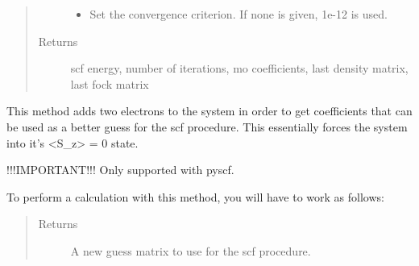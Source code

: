 \documentclass[letterpaper,10pt,english]{sphinxmanual}
\begin{document}
\begin{fulllineitems}
\begin{fulllineitems}
\begin{quote}
\begin{description}
\begin{itemize}
\item {} 
 \textendash{} Set the convergence criterion. If none is given, 1e-12 is used.

\end{itemize}

\item[{Returns}] \leavevmode
scf energy, number of iterations, mo coefficients, last density matrix, last fock matrix

\end{description}\end{quote}

\end{fulllineitems}


\begin{fulllineitems}
\label{\detokenize{UHF:ghf.UHF.UHF.extra_electron_guess}}
This method adds two electrons to the system in order to get coefficients that can be used as a better guess
for the scf procedure. This essentially forces the system into it’s \textless{}S\_z\textgreater{} = 0 state.

!!!IMPORTANT!!! Only supported with pyscf.

To perform a calculation with this method, you will have to work as follows:

\begin{sphinxVerbatim}[commandchars=\\\{\}]
           
   
  
\end{sphinxVerbatim}
\begin{quote}\begin{description}
\item[{Returns}] \leavevmode
A new guess matrix to use for the scf procedure.


\end{description}
\end{quote}
\end{fulllineitems}
\end{fulllineitems}
\end{document}
